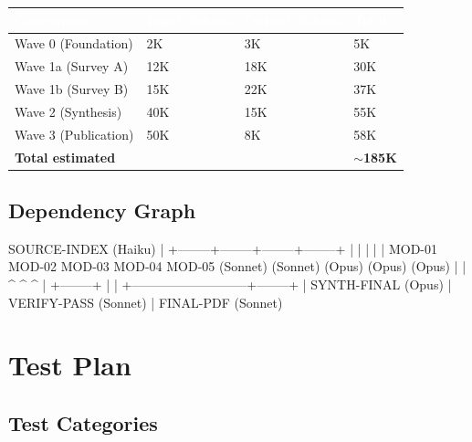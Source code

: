 \documentclass[11pt,letterpaper]{article}
\newcommand{\tableheader}[1]{\textbf{\sffamily\textcolor{white}{#1}}}
\begin{document}
\begin{center}
\begin{tabularx}{\textwidth}{L{4cm}C{2cm}C{2cm}C{2cm}}
\toprule
{}
\tableheader{Component} & \tableheader{Input Tokens} & \tableheader{Output Tokens} & \tableheader{Total} \\
\midrule
Wave 0 (Foundation) & 2K & 3K & 5K \\
Wave 1a (Survey A) & 12K & 18K & 30K \\
Wave 1b (Survey B) & 15K & 22K & 37K \\
Wave 2 (Synthesis) & 40K & 15K & 55K \\
Wave 3 (Publication) & 50K & 8K & 58K \\
\midrule
\textbf{Total estimated} & & & \textbf{$\sim$185K} \\
\bottomrule
\end{tabularx}
\end{center}

\subsection{Dependency Graph}

\begin{asciibox}
SOURCE-INDEX (Haiku)
      |
      +--------+--------+--------+--------+
      |        |        |        |        |
   MOD-01   MOD-02   MOD-03   MOD-04   MOD-05
  (Sonnet) (Sonnet) (Opus)   (Opus)   (Opus)
      |        |        ^        ^        ^
      |        +--------+        |        |
      +---------------------------+--------+
                    |
               SYNTH-FINAL (Opus)
                    |
               VERIFY-PASS (Sonnet)
                    |
               FINAL-PDF (Sonnet)
\end{asciibox}

\section{Test Plan}

\subsection{Test Categories}
\end{document}
